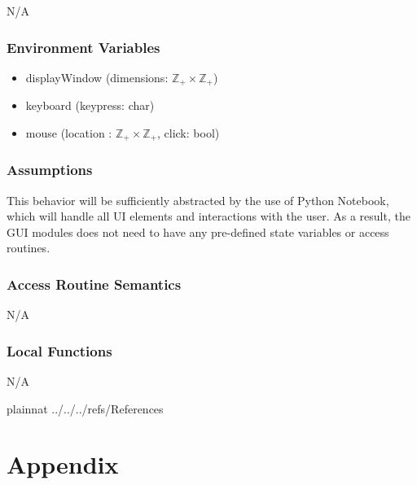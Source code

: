 \documentclass[12pt, titlepage]{article}
\begin{document}
N/A

\subsubsection{Environment Variables}

\begin{itemize}
  \item displayWindow (dimensions: $\mathbb{Z}_+ \times \mathbb{Z}_+$)
  \item keyboard (keypress: char)
  \item mouse (location : $\mathbb{Z}_+ \times \mathbb{Z}_+$, click: bool)
\end{itemize}

\subsubsection{Assumptions}

This behavior will be sufficiently abstracted by the use of Python Notebook,
which will handle all UI elements and interactions with the user. As a result,
the GUI modules does not need to have any pre-defined state variables or access
routines.

\subsubsection{Access Routine Semantics}

N/A

\subsubsection{Local Functions}

N/A

\newpage

 {plainnat}
 {../../../refs/References}

\newpage

\section{Appendix} \label{Appendix}


\newpage{}
\end{document}
